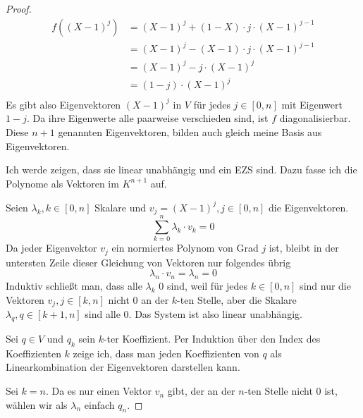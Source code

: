 \documentclass[10pt,a4paper]{article}
\begin{document}
\begin{proof}
\begin{align*}
f \left( (X - 1)^{j} \right) & = (X - 1)^{j} + (1 - X) \cdot j \cdot (X - 1)^{j - 1}\\
& = (X - 1)^{j} - (X - 1) \cdot j \cdot (X - 1)^{j - 1}\\
& = (X - 1)^{j} - j \cdot (X - 1)^{j}\\
& = (1 - j) \cdot (X - 1)^{j}\\
\end{align*}
Es gibt also Eigenvektoren $(X - 1)^{j}$ in $V$ für jedes $j \in [0, n]$ mit Eigenwert $1 - j$.
Da ihre Eigenwerte alle paarweise verschieden sind, ist $f$ diagonalisierbar.
Diese $n + 1$ genannten Eigenvektoren, bilden auch gleich meine Basis aus Eigenvektoren.

Ich werde zeigen, dass sie linear unabhängig und ein EZS sind.
Dazu fasse ich die Polynome als Vektoren im $K^{n + 1}$ auf.

Seien $\lambda_{k}, k \in [0, n]$ Skalare und $v_{j} = (X - 1)^{j}, j \in [0, n]$ die Eigenvektoren.
\begin{equation}
\sum_{k = 0}^{n} \lambda_{k} \cdot v_{k} = 0
\end{equation}
Da jeder Eigenvektor $v_{j}$ ein normiertes Polynom von Grad $j$ ist, bleibt in der untersten Zeile dieser Gleichung von Vektoren nur folgendes übrig
\begin{equation}
\lambda_{n} \cdot v_{n} = \lambda_{n} = 0
\end{equation}
Induktiv schließt man, dass alle $\lambda_{k}$ $0$ sind, weil für jedes $k \in [0, n]$ sind nur die Vektoren $v_{j}, j \in [k, n]$ nicht $0$ an der $k$-ten Stelle, aber die Skalare $\lambda_{q}, q \in [k + 1, n]$ sind alle $0$.
Das System ist also linear unabhängig.

Sei $q \in V$ und $q_{k}$ sein $k$-ter Koeffizient.
Per Induktion über den Index des Koeffizienten $k$ zeige ich, dass man jeden Koeffizienten von $q$ als Linearkombination der Eigenvektoren darstellen kann.

Sei $k = n$.
Da es nur einen Vektor $v_{n}$ gibt, der an der $n$-ten Stelle nicht $0$ ist, wählen wir als $\lambda_{n}$ einfach $q_{n}$.


\end{proof}
\end{document}
